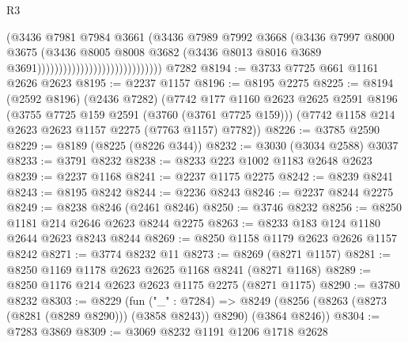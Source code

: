 \begin{lexlean}{R3}
\begin{coremodule}
                                                    (@3436
                                                      @7981
                                                      @7984
                                                      @3661
                                                      (@3436
                                                        @7989
                                                        @7992
                                                        @3668
                                                        (@3436
                                                          @7997
                                                          @8000
                                                          @3675
                                                          (@3436
                                                            @8005
                                                            @8008
                                                            @3682
                                                            (@3436
                                                              @8013
                                                              @8016
                                                              @3689
                                                              @3691)))))))))))))))))))))))))))))
    @7282
@8194 := @3733 @7725 @661 @1161 @2626 @2623
@8195 := @2237 @1157
@8196 := @8195 @2275
@8225 := @8194
    (@2592 @8196)
    (@2436 @7282)
    (@7742
      @177
      @1160
      @2623
      @2625
      @2591
      @8196
      (@3755 @7725 @159 @2591 (@3760 (@3761 @7725 @159)))
      (@7742 @1158 @214 @2623 @2623 @1157 @2275 (@7763 @1157) @7782))
@8226 := @3785 @2590
@8229 := @8189 (@8225 (@8226 @344))
@8232 := @3030 (@3034 @2588) @3037
@8233 := @3791 @8232
@8238 := @8233 @223 @1002 @1183 @2648 @2623
@8239 := @2237 @1168
@8241 := @2237 @1175 @2275
@8242 := @8239 @8241
@8243 := @8195 @8242
@8244 := @2236 @8243
@8246 := @2237 @8244 @2275
@8249 := @8238 @8246 (@2461 @8246)
@8250 := @3746 @8232
@8256 := @8250 @1181 @214 @2646 @2623 @8244 @2275
@8263 := @8233 @183 @124 @1180 @2644 @2623 @8243 @8244
@8269 := @8250 @1158 @1179 @2623 @2626 @1157 @8242
@8271 := @3774 @8232 @11
@8273 := @8269 (@8271 @1157)
@8281 := @8250 @1169 @1178 @2623 @2625 @1168 @8241 (@8271 @1168)
@8289 := @8250 @1176 @214 @2623 @2623 @1175 @2275 (@8271 @1175)
@8290 := @3780 @8232
@8303 := @8229
    (fun ("_" : @7284) =>
    @8249 (@8256 (@8263 (@8273 (@8281 (@8289 @8290))) (@3858 @8243)) @8290) (@3864 @8246))
@8304 := @7283 @3869
@8309 := @3069 @8232 @1191 @1206 @1718 @2628

\end{coremodule}
\end{lexlean}
